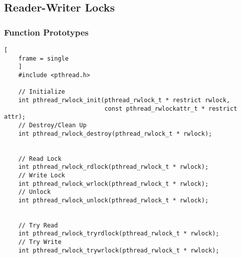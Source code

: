 \documentclass{article}
\begin{document}
\clearpage
\subsection{Reader-Writer Locks}
\subsubsection{Function Prototypes}
\begin{lstlisting}[
    frame = single
    ]
    #include <pthread.h>

    // Initialize
    int pthread_rwlock_init(pthread_rwlock_t * restrict rwlock,
                            const pthread_rwlockattr_t * restrict attr);
    // Destroy/Clean Up
    int pthread_rwlock_destroy(pthread_rwlock_t * rwlock);


    // Read Lock
    int pthread_rwlock_rdlock(pthread_rwlock_t * rwlock);
    // Write Lock
    int pthread_rwlock_wrlock(pthread_rwlock_t * rwlock);
    // Unlock
    int pthread_rwlock_unlock(pthread_rwlock_t * rwlock);


    // Try Read
    int pthread_rwlock_tryrdlock(pthread_rwlock_t * rwlock);
    // Try Write
    int pthread_rwlock_trywrlock(pthread_rwlock_t * rwlock);

\end{lstlisting}
\end{document}
